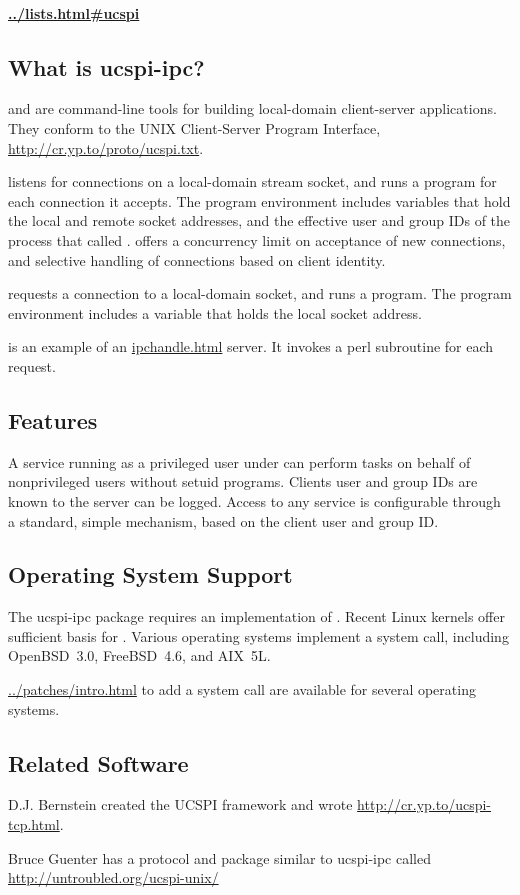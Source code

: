 \documentclass{book}
\begin{document}
\paragraph{\href{A mailing list for ucspi-ipc and general ucspi discussion}{../lists.html\#ucspi}}


\subsection{What is ucspi-ipc?}
 and  are command-line tools for
building local-domain client-server applications.  They conform to the
UNIX Client-Server Program Interface,
\href{UCSPI}{http://cr.yp.to/proto/ucspi.txt}.

 listens for connections on a local-domain
stream socket, and runs a program for each connection it accepts.  The
program environment includes variables that hold the local and remote
socket addresses, and the effective user and group IDs of the process
that called .   offers a concurrency limit
on acceptance of new connections, and selective handling of
connections based on client identity.

 requests a connection to a local-domain socket,
and runs a program.  The program environment includes a variable that
holds the local socket address.

 is an example of an \href{\cmd{ipchandle}}{ipchandle.html}
server.  It invokes a perl subroutine for each request.

\subsection{Features}
A service running as a privileged user under  can perform tasks
on behalf of nonprivileged users without setuid programs.  Clients user and
group IDs are known to the server can be logged.  Access to any service is
configurable through a standard, simple mechanism, based on the client user and
group ID.

\subsection{Operating System Support}
The ucspi-ipc package requires an implementation of .
Recent Linux kernels offer sufficient basis for .
Various operating systems implement a  system call,
including OpenBSD~3.0, FreeBSD~4.6, and AIX~5L.

\href{Patches}{../patches/intro.html} to add a  system
call are available for several operating systems.


\subsection{Related Software}
D.J. Bernstein created the UCSPI framework and wrote
\href{ucspi-tcp}{http://cr.yp.to/ucspi-tcp.html}.

Bruce Guenter has a protocol and package similar to ucspi-ipc called
\href{ucspi-unix}{http://untroubled.org/ucspi-unix/}
\end{document}
